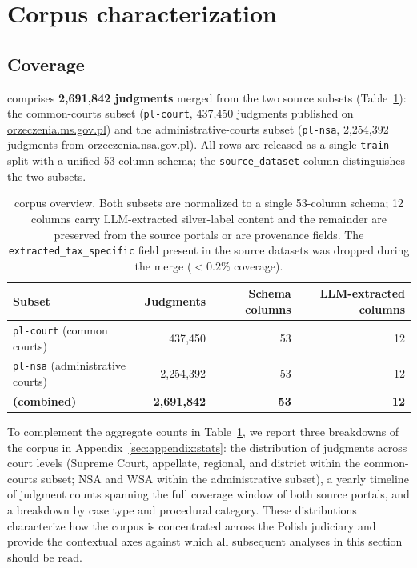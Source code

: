 
\section{Corpus characterization}
\label{sec:characterization}

\subsection{Coverage}
\label{sec:characterization:coverage}

\juddgespl{} comprises \textbf{2{,}691{,}842 judgments} merged from the two source subsets (Table~\ref{tab:corpus-overview}): the common-courts subset (\texttt{pl-court}, 437{,}450 judgments published on \url{orzeczenia.ms.gov.pl}) and the administrative-courts subset (\texttt{pl-nsa}, 2{,}254{,}392 judgments from \url{orzeczenia.nsa.gov.pl}). All rows are released as a single \texttt{train} split with a unified 53-column schema; the \texttt{source\_dataset} column distinguishes the two subsets.

\begin{table}[h]
\centering
\small
\begin{tabular}{lrrr}
\toprule
\textbf{Subset} & \textbf{Judgments} & \textbf{Schema columns} & \textbf{LLM-extracted columns} \\
\midrule
\texttt{pl-court} (common courts)         & 437{,}450    & 53 & 12 \\
\texttt{pl-nsa} (administrative courts)   & 2{,}254{,}392 & 53 & 12 \\
\midrule
\textbf{\juddgespl{} (combined)}          & \textbf{2{,}691{,}842} & \textbf{53} & \textbf{12} \\
\bottomrule
\end{tabular}
\caption{\juddgespl{} corpus overview. Both subsets are normalized to a single 53-column schema; 12 columns carry LLM-extracted silver-label content and the remainder are preserved from the source portals or are provenance fields. The \texttt{extracted\_tax\_specific} field present in the source datasets was dropped during the merge ($<\!0.2\%$ coverage).}
\label{tab:corpus-overview}
\end{table}

To complement the aggregate counts in Table~\ref{tab:corpus-overview}, we report three breakdowns of the \juddgespl{} corpus in Appendix~\ref{sec:appendix:stats}: the distribution of judgments across court levels (Supreme Court, appellate, regional, and district within the common-courts subset; NSA and WSA within the administrative subset), a yearly timeline of judgment counts spanning the full coverage window of both source portals, and a breakdown by case type and procedural category. These distributions characterize how the corpus is concentrated across the Polish judiciary and provide the contextual axes against which all subsequent analyses in this section should be read.

